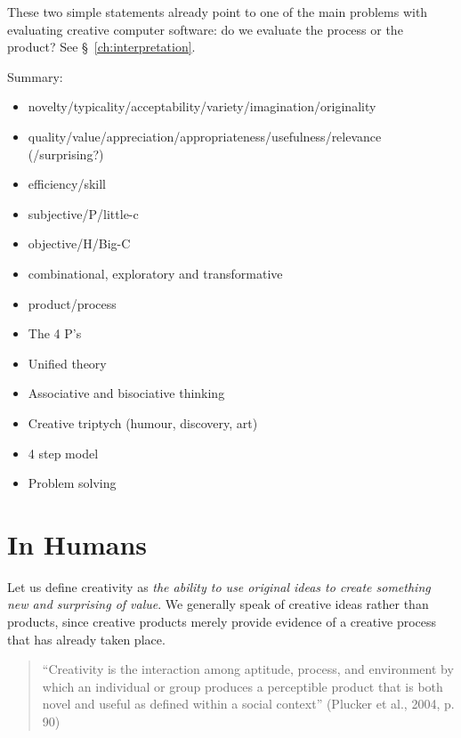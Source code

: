 \begin{draft}
  These two simple statements already point to one of the main problems with evaluating creative computer software: do we evaluate the process or the product? See §~\ref{ch:interpretation}.
\end{draft}


\clearpage

\vspace*{\fill}

\begin{shaded}
  Summary:
  \begin{itemize}
    \item novelty/typicality/acceptability/variety/imagination/originality
    \item quality/value/appreciation/appropriateness/usefulness/relevance (/surprising?)
    \item efficiency/skill
    \item subjective/P/little-c
    \item objective/H/Big-C
    \item combinational, exploratory and transformative
    \item product/process
    \item The 4 P’s
    \item Unified theory
    \item Associative and bisociative thinking
    \item Creative triptych (humour, discovery, art)
    \item 4 step model
    \item Problem solving
  \end{itemize}
\end{shaded}

\clearpage


\section{In Humans}


Let us define creativity as \emph{the ability to use original ideas to create something new and surprising of value}. We generally speak of creative ideas rather than products, since creative products merely provide evidence of a creative process that has already taken place.

\begin{quote}
  ``Creativity is the interaction among aptitude, process, and environment by which an individual or group produces a perceptible product that is both novel and useful as defined within a social context'' (Plucker et al., 2004, p. 90) \autocite{Jordanous2012}
\end{quote}


